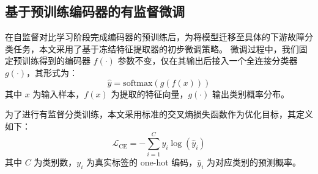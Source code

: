 \documentclass[master]{thesis-uestc}
\begin{document}
\subsection{基于预训练编码器的有监督微调}

在自监督对比学习阶段完成编码器的预训练后，为将模型迁移至具体的下游故障分类任务，本文采用了基于冻结特征提取器的初步微调策略。
微调过程中，我们固定预训练得到的编码器 $f(\cdot)$ 参数不变，仅在其输出后接入一个全连接分类器 $g(\cdot)$，其形式为：
\begin{equation}
    \hat{y} = \text{softmax}(g(f(x)))
\end{equation}
其中 $x$ 为输入样本，$f(x)$ 为提取的特征向量，$g(\cdot)$ 输出类别概率分布。

为了进行有监督分类训练，本文采用标准的交叉熵损失函数作为优化目标，其定义如下：
\begin{equation}
    \mathcal{L}_{\text{CE}} = - \sum_{i=1}^{C} y_i \log(\hat{y}_i)
\end{equation}
其中 $C$ 为类别数，$y_i$ 为真实标签的 one-hot 编码，$\hat{y}_i$ 为对应类别的预测概率。


\end{document}
